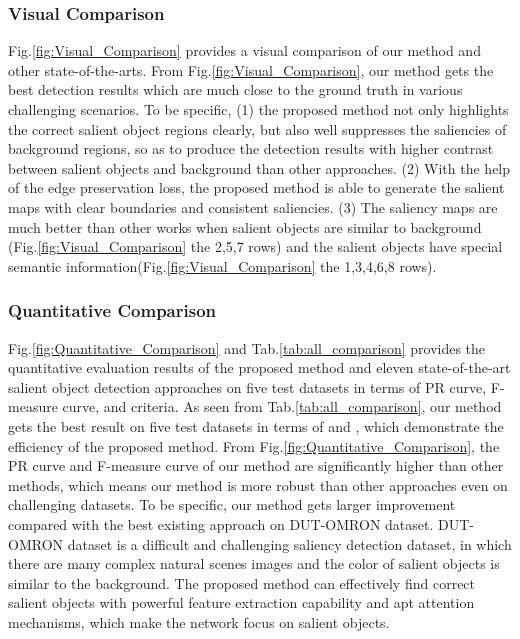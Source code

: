 \documentclass[10pt,twocolumn,letterpaper]{article}
\begin{document}
\subsubsection{Visual Comparison}
Fig.\ref{fig:Visual_Comparison} provides a visual comparison of our method and other state-of-the-arts. From Fig.\ref{fig:Visual_Comparison}, our method gets the best detection results which are much close to the ground truth in various challenging scenarios. To be specific, (1) the proposed method not only highlights the correct salient object regions clearly, but also well suppresses the saliencies of background regions, so as to produce the detection results with higher contrast between salient objects and background than other approaches. (2) With the help of the edge preservation loss, the proposed method is able to generate the salient maps with clear boundaries and consistent saliencies. (3) The saliency maps are much better than other works when salient objects are similar to background (Fig.\ref{fig:Visual_Comparison} the 2,5,7 rows) and the salient objects have special semantic information(Fig.\ref{fig:Visual_Comparison} the 1,3,4,6,8 rows).

\subsubsection{Quantitative Comparison}
Fig.\ref{fig:Quantitative_Comparison} and Tab.\ref{tab:all_comparison} provides the quantitative evaluation results of the proposed method and eleven state-of-the-art salient object detection approaches on five test datasets in terms of PR curve,  F-measure curve,  and  criteria. As seen from Tab.\ref{tab:all_comparison}, our method gets the best result on five test datasets in terms of  and , which demonstrate the efficiency of the proposed method. From Fig.\ref{fig:Quantitative_Comparison}, the PR curve and F-measure curve of our method are significantly higher than other methods, which means our method is more robust than other approaches even on challenging datasets. To be specific, our method gets larger improvement compared with the best existing approach on DUT-OMRON dataset. DUT-OMRON dataset is a difficult and challenging saliency detection dataset, in which there are many complex natural scenes images and the color of salient objects is similar to the background. The proposed method can effectively find correct salient objects with powerful feature extraction capability and apt attention mechanisms, which make the network focus on salient objects.
\end{document}
